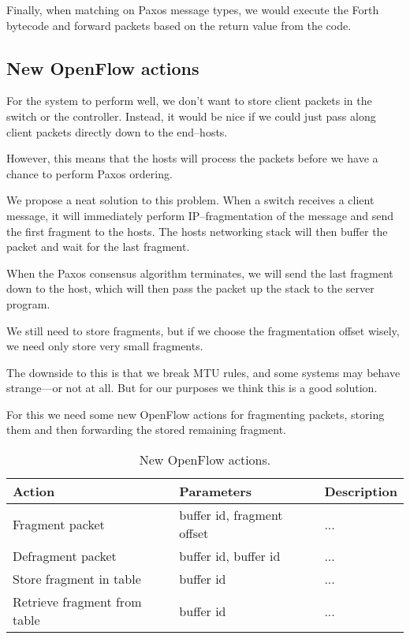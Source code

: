 Finally, when matching on Paxos message types, we would execute the Forth
bytecode and forward packets based on the return value from the code.

\subsection{New OpenFlow actions}

For the system to perform well, we don't want to store client packets in the
switch or the controller.  Instead, it would be nice if we could just pass
along client packets directly down to the end--hosts.

However, this means that the hosts will process the packets before we have a
chance to perform Paxos ordering.

We propose a neat solution to this problem.  When a switch receives a client
message, it will immediately perform IP--fragmentation of the message and
send the first fragment to the hosts.  The hosts networking stack will then
buffer the packet and wait for the last fragment.

When the Paxos consensus algorithm terminates, we will send the last
fragment down to the host, which will then pass the packet up the stack to
the server program.

We still need to store fragments, but if we choose the fragmentation offset
wisely, we need only store very small fragments.

The downside to this is that we break MTU rules, and some systems may behave
strange---or not at all.  But for our purposes we think this is a good
solution.

For this we need some new OpenFlow actions for fragmenting packets, storing
them and then forwarding the stored remaining fragment.

\begin{table}[H]
  \centering
  \begin{tabular}{|l|l|l|}
    \hline \textbf{Action} & \textbf{Parameters} & \textbf{Description} \\
    \hline Fragment packet & buffer id, fragment offset & ... \\
    \hline Defragment packet & buffer id, buffer id & ... \\
    \hline Store fragment in table & buffer id & ... \\
    \hline Retrieve fragment from table & buffer id & ... \\
    \hline
  \end{tabular}

  \caption{New OpenFlow actions.}
  \label{table:openflow.new.actions}
\end{table}

